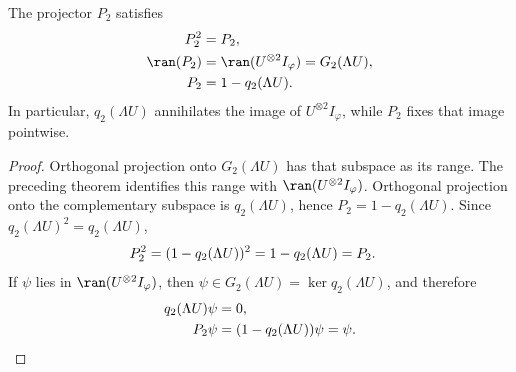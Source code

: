 \begin{lemma}
    \label{thm:appendixB_two_site_basic_support_projector}
    \leanok
    The projector $P_2$ satisfies
    \begin{align}
        P_2^2
         & =
        P_2,
        \notag \\
        \ran(P_2)
         & =
        \ran(U^{\otimes2}I_\varphi) =
        G_2(\Lambda U),
        \notag \\
        P_2
         & =
        1-q_2(\Lambda U).
        \notag
    \end{align}
    In particular, $q_2(\Lambda U)$ annihilates the image of
    $U^{\otimes2}I_\varphi$, while $P_2$ fixes that image pointwise.
\end{lemma}

\begin{proof}
    \leanok
    Orthogonal projection onto $G_2(\Lambda U)$ has that subspace as its range.
    The preceding theorem identifies this range with
    $\ran(U^{\otimes2}I_\varphi)$. Orthogonal projection onto the complementary
    subspace is $q_2(\Lambda U)$, hence $P_2=1-q_2(\Lambda U)$. Since
    $q_2(\Lambda U)^2=q_2(\Lambda U)$,
    \begin{align}
        P_2^2
         & =
        (1-q_2(\Lambda U))^2 =
        1-q_2(\Lambda U) =
        P_2.
        \notag
    \end{align}
    If $\psi$ lies in $\ran(U^{\otimes2}I_\varphi)$, then
    $\psi\in G_2(\Lambda U)=\ker q_2(\Lambda U)$, and therefore
    \begin{align}
        q_2(\Lambda U)\psi
         & =
        0,
        \notag \\
        P_2\psi
         & =
        (1-q_2(\Lambda U))\psi =
        \psi.
        \notag
    \end{align}
\end{proof}

